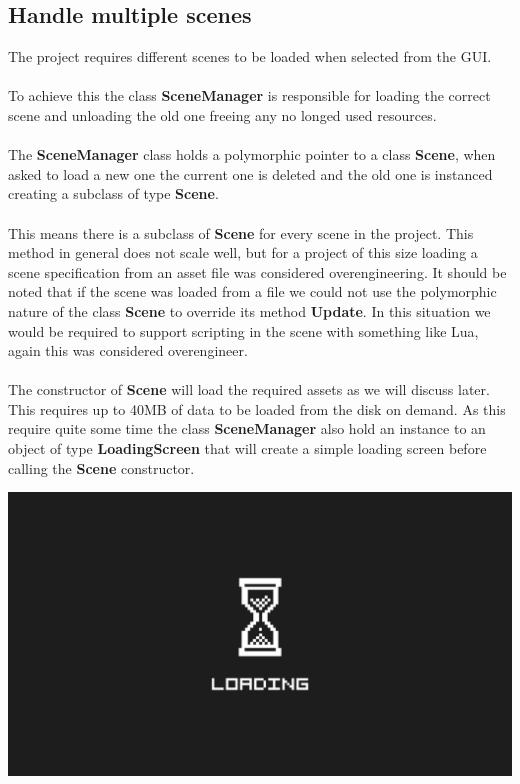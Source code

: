 \documentclass[12pt, a4paper]{article}
\begin{document}
\subsection{Handle multiple scenes}
The project requires different scenes to be loaded when selected from the GUI.\\\\
To achieve this the class \textbf{SceneManager} is responsible for loading the correct scene and unloading the old one
freeing any no longed used resources.\\\\
The \textbf{SceneManager} class holds a polymorphic pointer to a class \textbf{Scene}, when asked to load a new one
the current one is deleted and the old one is instanced creating a subclass of type \textbf{Scene}.\\\\
This means there is a subclass of \textbf{Scene} for every scene in the project. This method in general does not
scale well, but for a project of this size loading a scene specification from an asset file was considered overengineering.
It should be noted that if the scene was loaded from a file we could not use the polymorphic nature of the class
\textbf{Scene} to override its method \textbf{Update}. In this situation we would be required to support scripting in the
scene with something like Lua, again this was considered overengineer.\\\\
The constructor of \textbf{Scene} will load the required assets as we will discuss later. This requires up to 40MB of 
data to be loaded from the disk on demand. As this require quite some time the class \textbf{SceneManager} also
hold an instance to an object of type \textbf{LoadingScreen} that will create a simple loading screen before calling
the \textbf{Scene} constructor.
\begin{center}
    \centering
    \includegraphics[width=1.0\textwidth]{img/loading.png}
\end{center}
\end{document}
